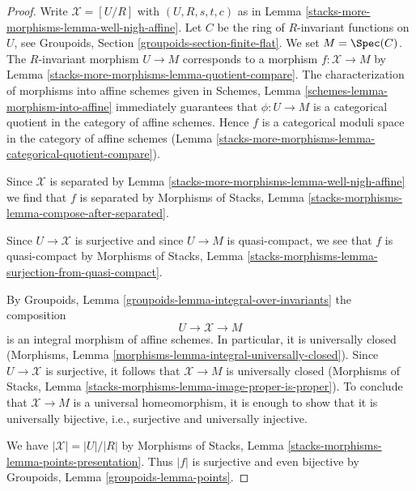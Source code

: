 \begin{proof}
Write $\mathcal{X} = [U/R]$ with $(U, R, s, t, c)$ as in
Lemma \ref{stacks-more-morphisms-lemma-well-nigh-affine}. Let $C$ be the ring of
$R$-invariant functions on $U$, see
Groupoids, Section \ref{groupoids-section-finite-flat}.
We set $M = \Spec(C)$. The $R$-invariant morphism
$U \to M$ corresponds to a morphism $f : \mathcal{X} \to M$ by
Lemma \ref{stacks-more-morphisms-lemma-quotient-compare}.
The characterization of morphisms into affine schemes given in
Schemes, Lemma \ref{schemes-lemma-morphism-into-affine}
immediately guarantees that $\phi : U \to M$ is a categorical
quotient in the category of affine schemes. Hence $f$ is a
categorical moduli space in the category of affine schemes
(Lemma \ref{stacks-more-morphisms-lemma-categorical-quotient-compare}).

\medskip\noindent
Since $\mathcal{X}$ is separated by Lemma \ref{stacks-more-morphisms-lemma-well-nigh-affine}
we find that $f$ is separated by Morphisms of Stacks, Lemma
\ref{stacks-morphisms-lemma-compose-after-separated}.

\medskip\noindent
Since $U \to \mathcal{X}$ is surjective and since $U \to M$ is quasi-compact,
we see that $f$ is quasi-compact by Morphisms of Stacks, Lemma
\ref{stacks-morphisms-lemma-surjection-from-quasi-compact}.

\medskip\noindent
By Groupoids, Lemma \ref{groupoids-lemma-integral-over-invariants}
the composition
$$
U \to \mathcal{X} \to M
$$
is an integral morphism of affine schemes. In particular, it is
universally closed
(Morphisms, Lemma \ref{morphisms-lemma-integral-universally-closed}).
Since $U \to \mathcal{X}$ is surjective, it follows that $\mathcal{X} \to M$
is universally closed (Morphisms of Stacks, Lemma
\ref{stacks-morphisms-lemma-image-proper-is-proper}).
To conclude that $\mathcal{X} \to M$ is a universal homeomorphism,
it is enough to show that it is universally bijective, i.e.,
surjective and universally injective.

\medskip\noindent
We have $|\mathcal{X}| = |U|/|R|$ by
Morphisms of Stacks, Lemma \ref{stacks-morphisms-lemma-points-presentation}.
Thus $|f|$ is surjective and even bijective
by Groupoids, Lemma \ref{groupoids-lemma-points}.


\end{proof}

